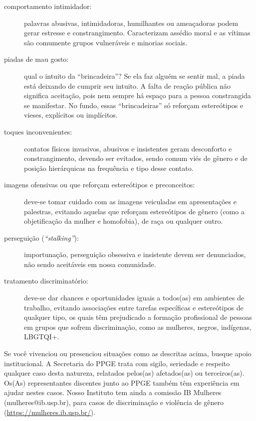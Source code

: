\begin{description}

\item[comportamento intimidador:] palavras abusivas, intimidadoras,
  humilhantes ou ameaçadoras podem gerar estresse e
  constrangimento. Caracterizam assédio moral e as vítimas são
  comumente grupos vulneráveis e minorias sociais.

\item[piadas de mau gosto:] qual o intuito da ``brincadeira''? Se ela
  faz alguém se sentir mal, a piada está deixando de cumprir seu
  intuito. A falta de reação pública não significa aceitação, pois nem
  sempre há espaço para a pessoa constrangida se manifestar. No fundo,
  essas ``brincadeiras'' só reforçam estereótipos e vieses, explícitos ou
  implícitos.

\item[toques inconvenientes:] contatos físicos invasivos, abusivos e
  insistentes geram desconforto e constrangimento, devendo ser
  evitados, sendo comum viés de gênero e de posição hierárquicas na
  frequência e tipo desse contato.

\item[imagens ofensivas ou que reforçam estereótipos e preconceitos:]
  deve-se tomar cuidado com as imagens veiculadas em apresentações e
  palestras, evitando aquelas que reforçam estereótipos de gênero
  (como a objetificação da mulher e homofobia), de raça ou qualquer
  outro.

\item[perseguição (\emph{“stalking”}):] importunação, perseguição obsessiva e
  insistente devem ser denunciados, não sendo aceitáveis em nossa
  comunidade.

\item[tratamento discriminatório:] deve-se dar chances e oportunidades
  iguais a todos(as) em ambientes de trabalho, evitando associações
  entre tarefas específicas e estereótipos de qualquer tipo, os quais
  têm prejudicado a formação profissional de pessoas em grupos que
  sofrem discriminação, como as mulheres, negros, indígenas, LBGTQI+.
\end{description}

Se você vivenciou ou presenciou situações como as descritas acima,
busque apoio institucional.  A Secretaria do PPGE trata com sigilo,
seriedade e respeito qualquer caso desta natureza, relatados pelos(as)
afetados(as) ou terceiros(as). Os(As) representantes discentes junto ao
PPGE também têm experiência em ajudar nestes casos. Nosso Instituto
tem ainda a comissão IB Mulheres (mulheres@ib.usp.br), para casos de
discriminação e violência de gênero
(\url{https://mulheres.ib.usp.br/}).


